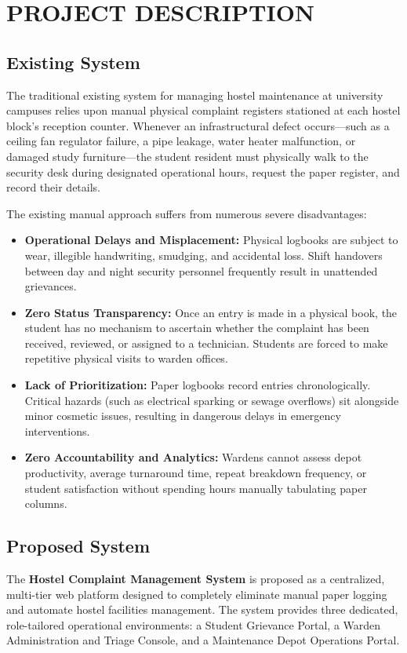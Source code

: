 \documentclass[10pt]{report}
\begin{document}
\chapter{PROJECT DESCRIPTION}
\linespread{1.5}

\section{Existing System}
\hspace{0.5cm}The traditional existing system for managing hostel maintenance at university campuses relies upon manual physical complaint registers stationed at each hostel block's reception counter. Whenever an infrastructural defect occurs---such as a ceiling fan regulator failure, a pipe leakage, water heater malfunction, or damaged study furniture---the student resident must physically walk to the security desk during designated operational hours, request the paper register, and record their details.

The existing manual approach suffers from numerous severe disadvantages:
\begin{itemize}
\item \textbf{Operational Delays and Misplacement:} Physical logbooks are subject to wear, illegible handwriting, smudging, and accidental loss. Shift handovers between day and night security personnel frequently result in unattended grievances.
\item \textbf{Zero Status Transparency:} Once an entry is made in a physical book, the student has no mechanism to ascertain whether the complaint has been received, reviewed, or assigned to a technician. Students are forced to make repetitive physical visits to warden offices.
\item \textbf{Lack of Prioritization:} Paper logbooks record entries chronologically. Critical hazards (such as electrical sparking or sewage overflows) sit alongside minor cosmetic issues, resulting in dangerous delays in emergency interventions.
\item \textbf{Zero Accountability and Analytics:} Wardens cannot assess depot productivity, average turnaround time, repeat breakdown frequency, or student satisfaction without spending hours manually tabulating paper columns.
\end{itemize}

\section{Proposed System}
\hspace{0.5cm}The \textbf{Hostel Complaint Management System} is proposed as a centralized, multi-tier web platform designed to completely eliminate manual paper logging and automate hostel facilities management. The system provides three dedicated, role-tailored operational environments: a Student Grievance Portal, a Warden Administration and Triage Console, and a Maintenance Depot Operations Portal.
\end{document}
